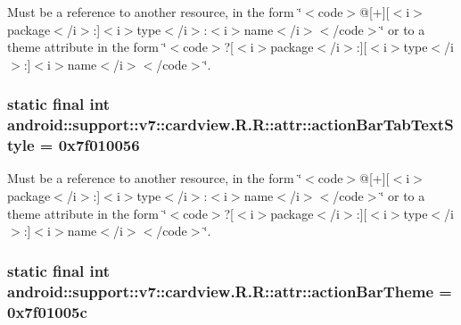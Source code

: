 Must be a reference to another resource, in the form \char`\"{}$<$code$>$@\mbox{[}+\mbox{]}\mbox{[}$<$i$>$package$<$/i$>$:\mbox{]}$<$i$>$type$<$/i$>$:$<$i$>$name$<$/i$>$$<$/code$>$\char`\"{} or to a theme attribute in the form \char`\"{}$<$code$>$?\mbox{[}$<$i$>$package$<$/i$>$:\mbox{]}\mbox{[}$<$i$>$type$<$/i$>$:\mbox{]}$<$i$>$name$<$/i$>$$<$/code$>$\char`\"{}. \hypertarget{classandroid_1_1support_1_1v7_1_1cardview_1_1_r_1_1attr_3be8bb64fcf3b29a0aca28ee57637095}{
\subsubsection[{actionBarTabTextStyle}]{\setlength{\rightskip}{0pt plus 5cm}static final int android::support::v7::cardview.R.R::attr::actionBarTabTextStyle = 0x7f010056}}
\label{classandroid_1_1support_1_1v7_1_1cardview_1_1_r_1_1attr_3be8bb64fcf3b29a0aca28ee57637095}


Must be a reference to another resource, in the form \char`\"{}$<$code$>$@\mbox{[}+\mbox{]}\mbox{[}$<$i$>$package$<$/i$>$:\mbox{]}$<$i$>$type$<$/i$>$:$<$i$>$name$<$/i$>$$<$/code$>$\char`\"{} or to a theme attribute in the form \char`\"{}$<$code$>$?\mbox{[}$<$i$>$package$<$/i$>$:\mbox{]}\mbox{[}$<$i$>$type$<$/i$>$:\mbox{]}$<$i$>$name$<$/i$>$$<$/code$>$\char`\"{}. \hypertarget{classandroid_1_1support_1_1v7_1_1cardview_1_1_r_1_1attr_4f21786fdbe659e2db8f198fda59ee6d}{
\subsubsection[{actionBarTheme}]{\setlength{\rightskip}{0pt plus 5cm}static final int android::support::v7::cardview.R.R::attr::actionBarTheme = 0x7f01005c}}
\label{classandroid_1_1support_1_1v7_1_1cardview_1_1_r_1_1attr_4f21786fdbe659e2db8f198fda59ee6d}


